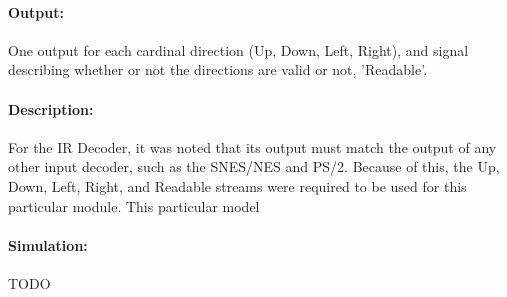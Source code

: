 \documentclass[]{article}
\begin{document}
\paragraph{Output:} One output for each cardinal direction (Up, Down, Left, Right), and signal describing whether or not the directions are valid or not, 'Readable'.
\paragraph{Description:} For the IR Decoder, it was noted that its output must match the output of any other input decoder, such as the SNES/NES and PS/2.
Because of this, the Up, Down, Left, Right, and Readable streams were required to be used for this particular module. This particular model 
\paragraph{Simulation:} TODO
\end{document}
